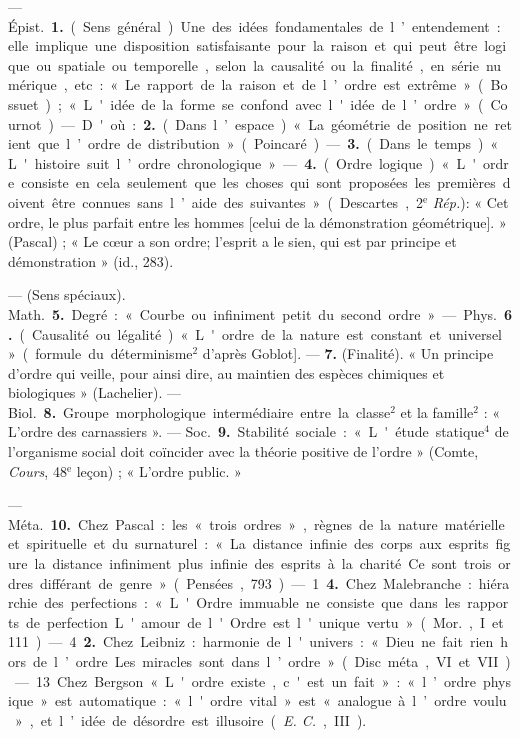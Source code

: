 \begin{itemize}[leftmargin=1cm, label=, itemsep=1pt]
 — \si{Épist.} {\bf 1.} (Sens général). Une
des idées fondamentales de l’entendement : elle implique une disposition satisfaisante pour la raison et
qui peut être logique ou spatiale ou
temporelle, selon la causalité ou la
finalité, en série numérique, etc :
« Le rapport de la raison et de l’ordre
est extrême » (Bossuet) ; « L'idée de la
forme se confond avec l'idée de
l’ordre » (Cournot). — D'où : {\bf 2.}
(Dans l’espace). « La géométrie de
position ne retient que l’ordre de
distribution » (Poincaré). — {\bf 3.} (Dans
le temps). « L'histoire suit l’ordre
chronologique ». — {\bf 4.} (Ordre logique). « L'ordre consiste en cela
seulement que les choses qui sont
proposées les premières doivent être
connues sans l’aide des suivantes »
(Descartes, 2$^\text{e}$ {\it Rép.}): « Cet ordre, le
plus parfait entre les hommes [celui
de la démonstration géométrique]. »
(Pascal) ; « Le cœur a son ordre;
l'esprit a le sien, qui est par principe et démonstration » (id., 283).

— (Sens spéciaux). \si{Math.} {\bf 5.} Degré : « Courbe ou infiniment petit du
second ordre ». — \si{Phys.} {\bf 6.} (Causalité ou légalité). « L'ordre de la
nature est constant et universel »
(formule du déterminisme$^2$ d’après
Goblot]. — {\bf 7.} (Finalité). « Un principe d'ordre qui veille, pour ainsi
dire, au maintien des espèces chimiques et biologiques » (Lachelier).
— \si{Biol.} {\bf 8.} Groupe morphologique
intermédiaire entre la classe$^2$ et la
famille$^2$ : « L'ordre des carnassiers ».
— \si{Soc.} {\bf 9.} Stabilité sociale : « L'étude
statique$^4$ de l’organisme social doit
coïncider avec la théorie positive de
l'ordre » (Comte, {\it Cours}, 48$^\text{e}$ leçon) ;
« L'ordre public. »

— \si{Méta.} {\bf 10.} Chez Pascal : les
« trois ordres », règnes de la nature
matérielle et spirituelle et du surnaturel : « La distance infinie des
corps aux esprits figure la distance
infiniment plus infinie des esprits
à la charité. Ce sont trois ordres
différant de genre. » (Pensées, 793).
— 1 {\bf 4.} Chez Malebranche : hiérarchie des perfections : « L'Ordre
immuable ne consiste que dans les
rapports de perfection. L'amour de
l'Ordre est l'unique vertu » (\si{Mor.}, I
et 111). — 4 {\bf 2.} Chez Leibniz : harmonie de l'univers : « Dieu ne fait
rien hors de l’ordre... Les miracles
sont dans l’ordre » (Disc. méta., VI
et VII). — 13 Chez Bergson
« L'ordre existe, c'est un fait » :
« l’ordre physique » est automatique:
« l'ordre vital » est « analogue à
l’ordre voulu », et l’idée de désordre
est illusoire ({\it E. C.}, III).


\end{itemize}
